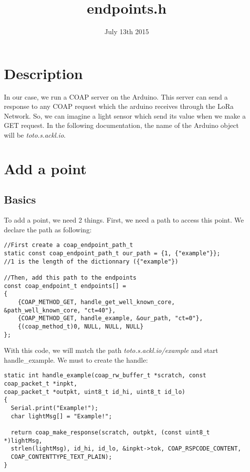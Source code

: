 \documentclass{article}
\title{endpoints.h}
\date{July 13th 2015}
\begin{document}
\maketitle

\tableofcontents

\section{Description}
In our case, we run a COAP server on the Arduino. This server can send a response to any COAP request which the arduino receives through the LoRa Network. So, we can imagine a light sensor which send its value when we make a GET request. In the following documentation, the name of the Arduino object will be \emph{toto.s.ackl.io}.

\section{Add a point}
\subsection{Basics}
To add a point, we need 2 things. First, we need a path to access this point. We declare the path as following:\\
\begin{verbatim}
//First create a coap_endpoint_path_t
static const coap_endpoint_path_t our_path = {1, {"example"}};
//1 is the length of the dictionnary ({"example"})

//Then, add this path to the endpoints
const coap_endpoint_t endpoints[] =
{
    {COAP_METHOD_GET, handle_get_well_known_core, &path_well_known_core, "ct=40"},
    {COAP_METHOD_GET, handle_example, &our_path, "ct=0"},
    {(coap_method_t)0, NULL, NULL, NULL}
};
\end{verbatim}
With this code, we will match the path \emph{toto.s.ackl.io/example} and start handle\_example. We must to create the handle:\\
\begin{verbatim}
static int handle_example(coap_rw_buffer_t *scratch, const coap_packet_t *inpkt, 
coap_packet_t *outpkt, uint8_t id_hi, uint8_t id_lo)
{
  Serial.print("Example!");
  char lightMsg[] = "Example!";

  return coap_make_response(scratch, outpkt, (const uint8_t *)lightMsg, 
  strlen(lightMsg), id_hi, id_lo, &inpkt->tok, COAP_RSPCODE_CONTENT, 
  COAP_CONTENTTYPE_TEXT_PLAIN);
}
\end{verbatim}
\end{document}
